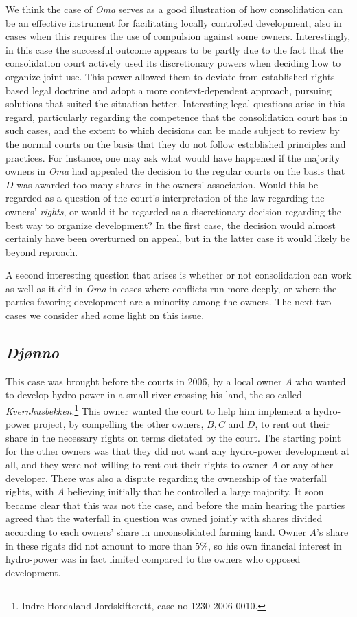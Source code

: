 We think the case of \emph{Oma} serves as a good illustration of how consolidation can be an effective instrument for facilitating locally controlled development, also in cases when this requires the use of compulsion against some owners. Interestingly, in this case the successful outcome appears to be partly due to the fact that the consolidation court actively used its discretionary powers when deciding how to organize joint use. This power allowed them to deviate from established rights-based legal doctrine and adopt a more context-dependent approach, pursuing solutions that suited the situation better. Interesting legal questions arise in this regard, particularly regarding the competence that the consolidation court has in such cases, and the extent to which decisions can be made subject to review by the normal courts on the basis that they do not follow established principles and practices. For instance, one may ask what would have happened if the majority owners in \emph{Oma} had appealed the decision to the regular courts on the basis that $D$ was awarded too many shares in the owners' association. Would this be regarded as a question of the court's interpretation of the law regarding the owners' \emph{rights}, or would it be regarded as a discretionary decision regarding the best way to organize development? In the first case, the decision would almost certainly have been overturned on appeal, but in the latter case it would likely be beyond reproach.

A second interesting question that arises is whether or not consolidation can work as well as it did in \emph{Oma} in cases where conflicts run more deeply, or where the parties favoring development are a minority among the owners. The next two cases we consider shed some light on this issue.

\subsection{\emph{Djønno}}

This case was brought before the courts in 2006, by a local owner $A$ who wanted to develop hydro-power in a small river crossing his land, the so called \emph{Kvernhusbekken}.\footnote{Indre Hordaland Jordskifterett, case no 1230-2006-0010.} This owner wanted the court to help him implement a hydro-power project, by compelling the other owners, $B, C$ and $D$, to rent out their share in the necessary rights on terms dictated by the court. The starting point for the other owners was that they did not want any hydro-power development at all, and they were not willing to rent out their rights to owner $A$ or any other developer. There was also a dispute regarding the ownership of the waterfall rights, with $A$ believing initially that he controlled a large majority. It soon became clear that this was not the case, and before the main hearing the parties agreed that the waterfall in question was owned jointly with shares divided according to each owners' share in unconsolidated farming land. Owner $A$'s share in these rights did not amount to more than $5 \%$, so his own financial interest in hydro-power was in fact limited compared to the owners who opposed development.

